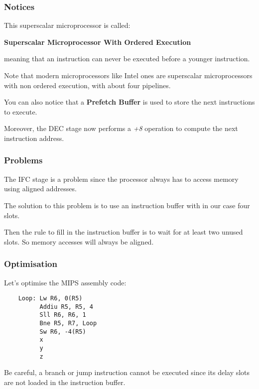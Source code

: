 \begin{frame}
  \frametitle{Notices}

  This superscalar microprocessor is called:

  \-

  \textbf{Superscalar Microprocessor With Ordered Execution}

  \-

  meaning that an instruction can never be executed before a
  younger instruction.

  \-

  Note that modern microprocessors like Intel ones are superscalar
  microprocessors with non ordered execution, with about four pipelines.

  \-

  You can also notice that a \textbf{Prefetch Buffer} is used to store
  the next instructions to execute.

  \-

  Moreover, the DEC stage now performs a \textit{+8} operation to compute
  the next instruction address.
\end{frame}


\begin{frame}
  \frametitle{Problems}

  The IFC stage is a problem since the processor always has to access
  memory using aligned addresses.

  \-

  The solution to this problem is to use an instruction buffer with in our
  case four slots.

  \-

  Then the rule to fill in the instruction buffer is to wait for at least
  two unused slots. So memory accesses will always be aligned.
\end{frame}


\begin{frame}[containsverbatim]
  \frametitle{Optimisation}

  Let's optimise the MIPS assembly code:

  \begin{verbatim}
    Loop: Lw R6, 0(R5)
          Addiu R5, R5, 4
          Sll R6, R6, 1
          Bne R5, R7, Loop
          Sw R6, -4(R5)
          x
          y
          z
  \end{verbatim}

  Be careful, a branch or jump instruction cannot be executed since its delay
  slots are not loaded in the instruction buffer.
\end{frame}

